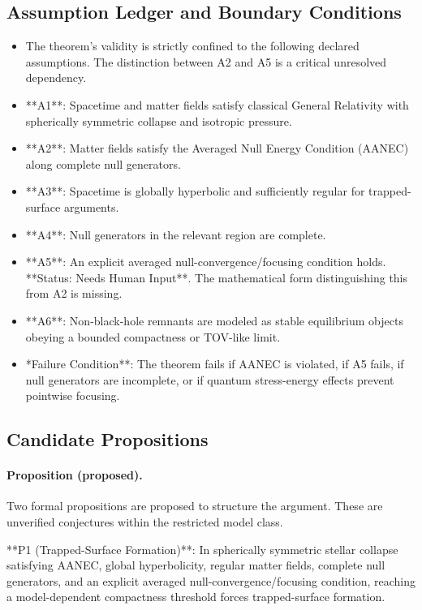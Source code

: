 \documentclass[conference]{IEEEtran}
\begin{document}
\subsection{Assumption Ledger and Boundary Conditions}
\begin{itemize}
\item The theorem's validity is strictly confined to the following declared assumptions. The distinction between A2 and A5 is a critical unresolved dependency.
\item **A1**: Spacetime and matter fields satisfy classical General Relativity with spherically symmetric collapse and isotropic pressure.
\item **A2**: Matter fields satisfy the Averaged Null Energy Condition (AANEC) along complete null generators.
\item **A3**: Spacetime is globally hyperbolic and sufficiently regular for trapped-surface arguments.
\item **A4**: Null generators in the relevant region are complete.
\item **A5**: An explicit averaged null-convergence/focusing condition holds. **Status: Needs Human Input**. The mathematical form distinguishing this from A2 is missing.
\item **A6**: Non-black-hole remnants are modeled as stable equilibrium objects obeying a bounded compactness or TOV-like limit.
\item *Failure Condition**: The theorem fails if AANEC is violated, if A5 fails, if null generators are incomplete, or if quantum stress-energy effects prevent pointwise focusing.
\end{itemize}

\subsection{Candidate Propositions}
\paragraph{Proposition (proposed).} Two formal propositions are proposed to structure the argument. These are unverified conjectures within the restricted model class.

**P1 (Trapped-Surface Formation)**: In spherically symmetric stellar collapse satisfying AANEC, global hyperbolicity, regular matter fields, complete null generators, and an explicit averaged null-convergence/focusing condition, reaching a model-dependent compactness threshold forces trapped-surface formation.
\end{document}

